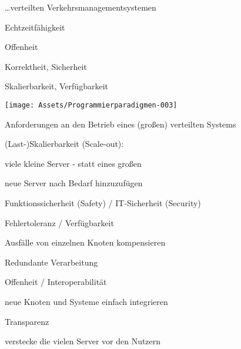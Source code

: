 \documentclass[10pt]{article}
\begin{document}
…verteilten Verkehrsmanagementsystemen\newline \newline
\begin{minipage}[h]{0.5\linewidth}
  \begin{itemize*}
    \item Echtzeitfähigkeit
    \item Offenheit
    \item Korrektheit, \newline Sicherheit
    \item Skalierbarkeit, \newline Verfügbarkeit
  \end{itemize*}
\end{minipage}
\begin{minipage}[h]{0.4\linewidth}
  \texttt{[image: Assets/Programmierparadigmen-003]}
\end{minipage}
\newline  \newline \newline \newline
\color{orange} Anforderungen \color{black} an den Betrieb eines (großen) verteilten Systems
\begin{itemize*}
  \item (Last-)Skalierbarkeit (Scale-out):
  \begin{itemize*}
    \item viele kleine Server - statt eines großen
    \item neue Server nach Bedarf hinzuzufügen
  \end{itemize*}
  \item Funktionssicherheit (Safety) / IT-Sicherheit (Security)
  \item Fehlertoleranz / Verfügbarkeit
  \begin{itemize*}
    \item Ausfälle von einzelnen Knoten kompensieren
    \item Redundante Verarbeitung
  \end{itemize*}
  \item Offenheit / Interoperabilität
  \begin{itemize*}
    \item neue Knoten und Systeme einfach integrieren
  \end{itemize*}
  \item Transparenz
  \begin{itemize*}
    \item verstecke die vielen Server vor den Nutzern
  \end{itemize*}
\end{itemize*}
\end{document}
